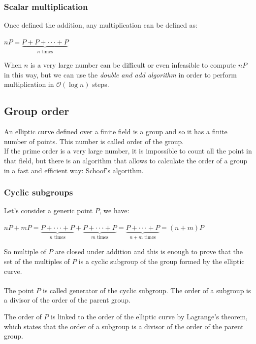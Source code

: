 \subsubsection{Scalar multiplication}
Once defined the addition, any multiplication can be defined as:
\begin{center} 
	$ nP=\underbrace{
		P+P+\cdot \cdot \cdot+P
	}_{n\text{ times}}$
\end{center}
When $n$ is a very large number can be difficult or even infeasible to compute $nP$ in this way, but we can use the \textit{double and add algorithm} in order to perform multiplication in $\mathcal{O}(\log{}n)$ steps.

\subsection{Group order}
An elliptic curve defined over a finite field is a group and so it has a finite number of points. This number is called order of the group.\\
If the prime order is a very large number, it is impossible to count all the point in that field, but there is an algorithm that allows to calculate the order of a group in a fast and efficient way: Schoof's algorithm.

\subsubsection{Cyclic subgroups}
Let's consider a generic point $P$, we have:
\begin{center} 
	$ nP+mP=\underbrace{
		P+\cdot \cdot \cdot+P
	}_{n\text{ times}}+
		\underbrace{
		P+\cdot \cdot \cdot+P
	}_{m\text{ times}}=
	\underbrace{
		P+\cdot \cdot \cdot+P
	}_{n+m\text{ times}} = 
	(n+m)P$
\end{center}
So multiple of $P$ are closed under addition and this is enough to prove that the set of the multiples of $P$ is a cyclic subgroup of the group formed by the elliptic curve.
\\ \\
The point $P$ is called generator of the cyclic subgroup. The order of a subgroup is a divisor of the order of the parent group. 

\begin{remark}
	The order of $P$ is linked to the order of the elliptic curve by Lagrange's theorem, which states that the order of a subgroup is a divisor of the order of the parent group.
\end{remark}

